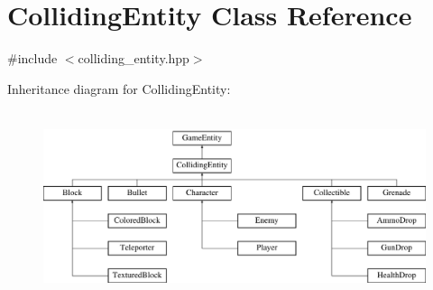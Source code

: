 \hypertarget{class_colliding_entity}{}\section{Colliding\+Entity Class Reference}
\label{class_colliding_entity}


{\ttfamily \#include $<$colliding\+\_\+entity.\+hpp$>$}

Inheritance diagram for Colliding\+Entity\+:\begin{figure}[H]
\begin{center}
\leavevmode
\includegraphics[height=5.600000cm]{class_colliding_entity}
\end{center}
\end{figure}
